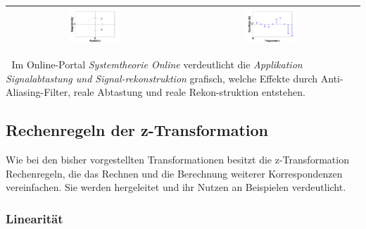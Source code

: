 \begin{table}[H]
{\begin{tabular}{| c | c |}
\parbox[c][1.4in][c]{3.3in}{\centerline{\includegraphics[width=0.3\textwidth]{Kapitel5/Table/image17.png}}} & 
\parbox[c][1.4in][c]{3.3in}{\centerline{\includegraphics[width=0.3\textwidth]{Kapitel5/Table/image18.png}}}\\ \hline

\end{tabular}%
}
\label{tab:fivethree}
\end{table}

\textcolor{white}{.}\newline
\noindent Im Online-Portal \textit{Systemtheorie Online} verdeutlicht die \textit{Applikation Signalabtastung und Signal-rekonstruktion} grafisch, welche Effekte durch Anti-Aliasing-Filter, reale Abtastung und reale Rekon-struktion entstehen.\newline  

\clearpage

\subsection{Rechenregeln der z-Transformation}

\noindent Wie bei den bisher vorgestellten Transformationen besitzt die z-Transformation Rechenregeln, die das Rechnen und die Berechnung weiterer Korrespondenzen vereinfachen. Sie werden hergeleitet und ihr Nutzen an Beispielen verdeutlicht.

\subsubsection{Linearit\"{a}t}

